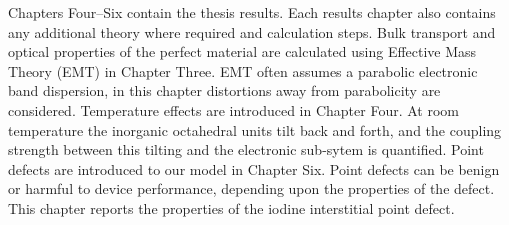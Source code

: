 Chapters Four--Six contain the thesis results. Each results chapter also contains any additional theory where required and calculation steps.
Bulk transport and optical properties of the perfect material are calculated using Effective Mass Theory (EMT) in Chapter Three. 
EMT often assumes a parabolic electronic band dispersion, in this chapter distortions away from parabolicity are considered.
Temperature effects are introduced in Chapter Four. 
At room temperature the inorganic octahedral  units tilt back and forth, and the coupling strength between this tilting and the electronic sub-sytem is quantified.
Point defects are introduced to our model in Chapter Six. Point defects can be benign or harmful to device performance, depending upon the properties of the defect. This chapter reports the properties of the iodine interstitial point defect.


